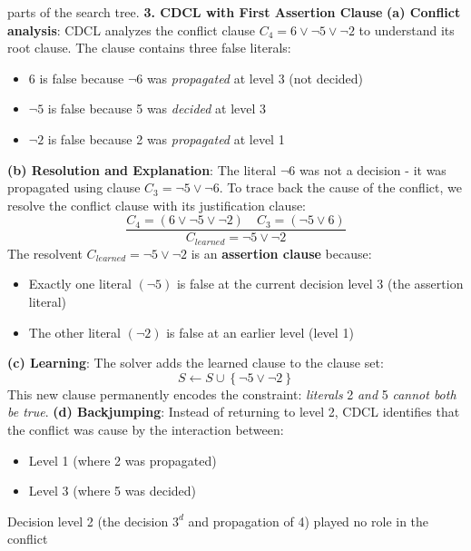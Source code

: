 \documentclass[a4paper]{article}
\theoremstyle{definition}
\begin{document}
parts of the search tree.
\textbf{3. CDCL with First Assertion Clause}
\vspace{1em}
\noindent 
\newline
\textbf{(a) Conflict analysis}: CDCL analyzes the conflict clause \( C_4 = 6 \vee \lnot 5 \vee \lnot 2 \) to understand its root clause. The clause contains 
three false literals:
\begin{itemize}
  \item 6 is false because \( \lnot 6 \) was \textit{propagated} at level 3 (not decided)
  \item \( \lnot 5 \) is false because 5 was \textit{decided} at level 3 
  \item \( \lnot 2 \) is false because 2 was \textit{propagated} at level 1
\end{itemize}
\textbf{(b) Resolution and Explanation}: The literal \( \lnot 6 \) was not a decision - it was propagated using clause 
\( C_3 = \lnot 5 \vee \lnot 6 \). To trace back the cause of the conflict, we resolve the conflict clause with its justification 
clause:
\[
  \frac{C_4 = (6 \vee \lnot 5 \vee \lnot 2) \quad C_3 = (\lnot 5 \vee 6)}{C_{learned} = \lnot 5 \vee \lnot 2}
\]
The resolvent \( C_{learned} = \lnot 5 \vee \lnot 2 \) is an \textbf{assertion clause} because:
\begin{itemize}
  \item Exactly one literal \( (\lnot 5) \) is false at the current decision level 3 (the assertion literal)
  \item The other literal \( (\lnot 2) \) is false at an earlier level (level 1)
\end{itemize}
\textbf{(c) Learning}: The solver adds the learned clause to the clause set:
\[
  S \leftarrow S \cup \left\{ \lnot 5 \vee \lnot 2 \right\}
\]
This new clause permanently encodes the constraint: \textit{literals} 2 \textit{and} 5 \textit{cannot both be true}.
\vspace{1em}
\noindent 
\newline
\textbf{(d) Backjumping}: Instead of returning to level 2, CDCL identifies that the conflict was cause by the interaction between:
\begin{itemize}
  \item Level 1 (where 2 was propagated)
  \item Level 3 (where 5 was decided)
\end{itemize}
Decision level 2 (the decision $3^d$ and propagation of 4) played no role in the conflict
\vspace{1em}
\end{document}
